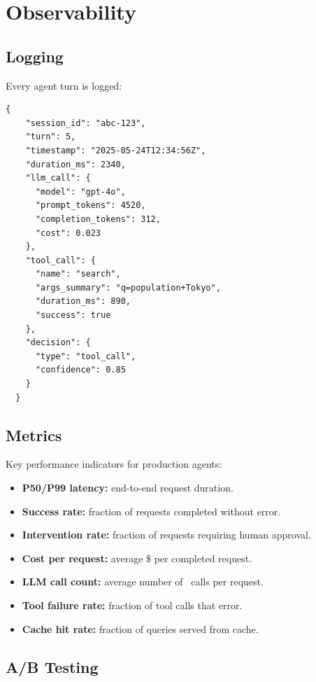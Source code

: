 \section{Observability}

\subsection{Logging}

Every agent turn is logged:

\begin{lstlisting}[caption=Agent log entry]
  {
    "session_id": "abc-123",
    "turn": 5,
    "timestamp": "2025-05-24T12:34:56Z",
    "duration_ms": 2340,
    "llm_call": {
      "model": "gpt-4o",
      "prompt_tokens": 4520,
      "completion_tokens": 312,
      "cost": 0.023
    },
    "tool_call": {
      "name": "search",
      "args_summary": "q=population+Tokyo",
      "duration_ms": 890,
      "success": true
    },
    "decision": {
      "type": "tool_call",
      "confidence": 0.85
    }
  }
\end{lstlisting}

\subsection{Metrics}

Key performance indicators for production agents:

\begin{itemize}
	\item \textbf{P50/P99 latency:} end-to-end request duration.
	\item \textbf{Success rate:} fraction of requests completed without error.
	\item \textbf{Intervention rate:} fraction of requests requiring human approval.
	\item \textbf{Cost per request:} average \$ per completed request.
	\item \textbf{LLM call count:} average number of \llm\ calls per request.
	\item \textbf{Tool failure rate:} fraction of tool calls that error.
	\item \textbf{Cache hit rate:} fraction of queries served from cache.
\end{itemize}

\subsection{A/B Testing}

